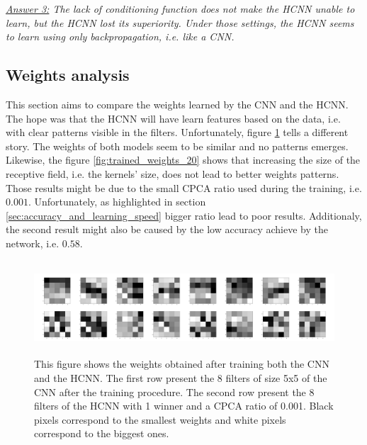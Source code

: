 \documentclass[11pt]{report}
\begin{document}
\noindent \textit{\underline{Answer 3:} The lack of conditioning function does not make the HCNN unable to learn, but the HCNN lost its superiority. Under those settings, the HCNN seems to learn using only backpropagation, i.e. like a CNN.}

\newpage
\subsection{Weights analysis}

This section aims to compare the weights learned by the CNN and the HCNN. The hope was that the HCNN will have learn features based on the data, i.e. with clear patterns visible in the filters. Unfortunately, figure \ref{fig:trained_weights} tells a different story. The weights of both models seem to be similar and no patterns emerges. Likewise, the figure \ref{fig:trained_weights_20} shows that increasing the size of the receptive field, i.e. the kernels' size, does not lead to better weights patterns. Those results might be due to the small CPCA ratio used during the training, i.e. $0.001$. Unfortunately, as highlighted in section \ref{sec:accuracy_and_learning_speed} bigger ratio lead to poor results. Additionaly, the second result might also be caused by the low accuracy achieve by the network, i.e. $0.58$.

\begin{figure}[h]
\centering
\includegraphics[width=16cm, height=3.5cm]{trained_weights}
\caption[Illustration of the CNN's and HCNN's weights obtained after training (5x5 kernels).]{This figure shows the weights obtained after training both the CNN and the HCNN. The first row present the 8 filters of size 5x5 of the CNN after the training procedure. The second row present the 8 filters of the HCNN with 1 winner and a CPCA ratio of 0.001. Black pixels correspond to the smallest weights and white pixels correspond to the biggest ones.}
\label{fig:trained_weights}
\end{figure}
\end{document}
